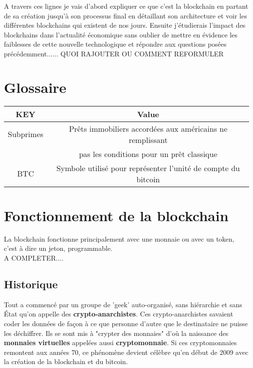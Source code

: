 \documentclass[12pt]{report}
\begin{document}
\hspace{1cm} A travers ces lignes je vais d'abord expliquer ce que c'est la blockchain en partant de sa création jusqu'à son processus final en détaillant son architecture et voir les différentes blockchains qui existent de nos jours. Ensuite j'étudierais l'impact des blockchains dans l'actualité économique sans oublier de mettre en évidence les faiblesses de cette nouvelle technologique et répondre aux questions posées précédemment...... QUOI RAJOUTER OU COMMENT REFORMULER


\newpage
\section{Glossaire}
\begin{tabular}{|c|c|}
\hline 
\rowcolor{green}KEY & Value \\

\hline
Subprimes & Prêts immobiliers accordées aux américains ne remplissant \\ & pas les conditions pour un prêt classique \\ 

\hline 
BTC & Symbole utilisé pour représenter l'unité de compte du bitcoin \\ 

\hline 
\end{tabular} 

\newpage
\section{Fonctionnement de la blockchain}
\hspace{1cm}  La blockchain fonctionne principalement avec une monnaie ou avec un token, c'est à dire un jeton, programmable.\\  A COMPLETER....

	\subsection{Historique}
\hspace{1cm} Tout a commencé par un groupe de 'geek' auto-organisé, sans hiérarchie et sans État qu'on appelle des \textbf{crypto-anarchistes}. Ces crypto-anarchistes savaient coder les données de façon à ce que personne d'autre que le destinataire ne puisse les déchiffrer. Ils se sont mis à "crypter des monnaies" d'où la naissance des\textbf{ monnaies virtuelles} appelées aussi \textbf{cryptomonnaie}. Si ces cryptomonnaies remontent aux années 70, ce phénomène devient célèbre qu'en début de 2009 avec la création de la blockchain et du bitcoin.\\
\end{document}
